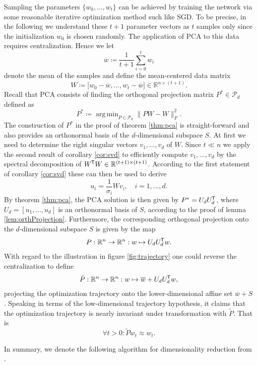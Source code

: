 \documentclass[11pt, a4paper]{article}
\newcommand{\R}{\mathbb{R}}
\renewcommand{\P}{\mathcal{P}}
\newcommand*{\tr}{^{\mkern-1.5mu\mathsf{T}}}
\DeclareMathOperator*{\argmin}{arg\,min}
\begin{document}
Sampling the parameters $\{ w_0, \dots, w_t \}$ can be achieved by training the network via some reasonable iterative optimization method such like SGD. To be precise, in the following we understand these $t+1$ parameter vectors as $t$ samples only since the initialization $w_0$ is chosen randomly. The application of PCA to this data requires centralization. Hence we let
\[ \overline{w} \coloneq \frac{1}{t+1} \sum_{i=0}^{t} w_i \]
denote the mean of the samples and define the mean-centered data matrix
\[ W \coloneq \big [ w_0 - \overline{w}, \dots, w_t - \overline{w} \big ] \in \R^{n \times (t+1)}. \]
Recall that PCA consists of finding the orthogonal projection matrix $P^* \in \P_d$ defined as
\[ P^* \coloneq \argmin_{P \in \P_d} \big \| PW - W \big \|_F^2. \]
The construction of $P^*$ in the proof of theorem \ref{thm:pca} is straight-forward and also provides an orthonormal basis of the $d$-dimensional subspace $S$. At first we need to determine the right singular vectors $v_1, \dots, v_d$ of $W$. Since $t \ll n$ we apply the second result of corollary \ref{cor:svd} to efficiently compute $v_1, \dots, v_d$ by the spectral decomposition of $W\tr W \in \R^{(t+1) \times (t+1)}$. According to the first statement of corollary \ref{cor:svd} these can then be used to derive
\[ u_i = \frac{1}{\sigma_i} Wv_i, \quad i=1, \dots, d. \]
By theorem \ref{thm:pca}, the PCA solution is then given by $P^* = U_dU_d \tr$, where $U_d = [u_1, \dots, u_d]$ is an orthonormal basis of $S$, according to the proof of lemma \ref{lem:orthProjection}. Furthermore, the corresponding orthogonal projection onto the $d$-dimensional subspace $S$ is given by the map
\[ P : \R^n \to \R^n : w \mapsto U_dU_d\tr w. \]
With regard to the illustration in figure \ref{fig:trajectory} one could reverse the centralization to define
\[ \tilde{P} : \R^n \to \R^n : w \mapsto \overline{w} + U_dU_d\tr w, \]
projecting the optimization trajectory onto the lower-dimensional affine set $\overline{w} + S$. Speaking in terms of the low-dimensional trajectory hypothesis, it claims that the optimization trajectory is nearly invariant under transformation with $\tilde{P}$. That is 
\[ \forall t>0: \tilde{P}w_t \approx w_t. \]

In summary, we denote the following algorithm for dimensionality reduction from \cite{Paper}.
\end{document}
